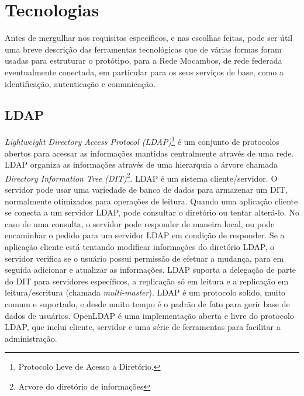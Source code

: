 \section{Tecnologias}
Antes de mergulhar nos requisitos específicos, e nas escolhas feitas,
pode ser útil uma breve descrição das ferramentas tecnológicas que de
várias formas foram usadas para estruturar o protótipo, para a Rede
Mocambos, de rede federada eventualmente conectada, em particular para
os seus serviços de base, como a identificação, autenticação e
comunicação.

\subsection{LDAP}
\emph{Lightweight Directory Access Protocol (LDAP)}\footnote{Protocolo
  Leve de Acesso a Diretório.} é um conjunto de protocolos abertos
para acessar as informações mantidas centralmente através de uma
rede. LDAP organiza as informações através de uma hierarquia a árvore
chamada \emph{Directory Information Tree (DIT)}\footnote{Arvore do
  diretório de informações}. LDAP é um sistema cliente/servidor. O
servidor pode usar uma variedade de banco de dados para armazenar um
DIT, normalmente otimizados para operações de leitura. Quando uma
aplicação cliente se conecta a um servidor LDAP, pode consultar o
diretório ou tentar alterá-lo. No caso de uma consulta, o servidor
pode responder de maneira local, ou pode encaminhar o pedido para um
servidor LDAP em condição de responder. Se a aplicação cliente está
tentando modificar informações do diretório LDAP, o servidor verifica
se o usuário possui permissão de efetuar a mudança, para em seguida
adicionar e atualizar as informações. LDAP suporta a delegação de
parte do DIT para servidores específicos, a replicação só em leitura e
a replicação em leitura/escritura (chamada \emph{multi-master}). LDAP
é um protocolo solido, muito comum e suportado, e desde muito tempo é
o padrão de fato para gerir base de dados de usuários. OpenLDAP é uma
implementação aberta e livre do protocolo LDAP, que inclui cliente,
servidor e uma série de ferramentas para facilitar a administração.
  
